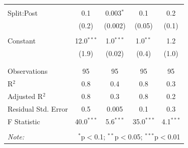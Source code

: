 \documentclass[12pt, a4paper]{article}
\begin{document}
\begin{table}[!htbp]
{\begin{tabular}{@{\extracolsep{5pt}}lcccc}
			& & & & \\ 
			Split:Post & 0.1 & 0.003$^{*}$ & 0.1 & 0.2 \\ 
			& (0.2) & (0.002) & (0.05) & (0.1) \\ 
			& & & & \\ 
			Constant & 12.0$^{***}$ & 1.0$^{***}$ & 1.0$^{**}$ & 1.2 \\ 
			& (1.9) & (0.02) & (0.4) & (1.0) \\ 
			& & & & \\ 
			\hline \\[-1.8ex] 
			Observations & 95 & 95 & 95 & 95 \\ 
			R$^{2}$ & 0.8 & 0.4 & 0.8 & 0.3 \\ 
			Adjusted R$^{2}$ & 0.8 & 0.3 & 0.8 & 0.2 \\ 
			Residual Std. Error & 0.5 & 0.005 & 0.1 & 0.3 \\ 
			F Statistic & 40.0$^{***}$ & 5.6$^{***}$ & 35.0$^{***}$ & 4.1$^{***}$ \\ 
			\hline 
			\hline \\[-1.8ex] 
			\textit{Note:}  & \multicolumn{4}{r}{$^{*}$p$<$0.1; $^{**}$p$<$0.05; $^{***}$p$<$0.01} \\ 
		\end{tabular} }
	\end{table} %
\end{document}

